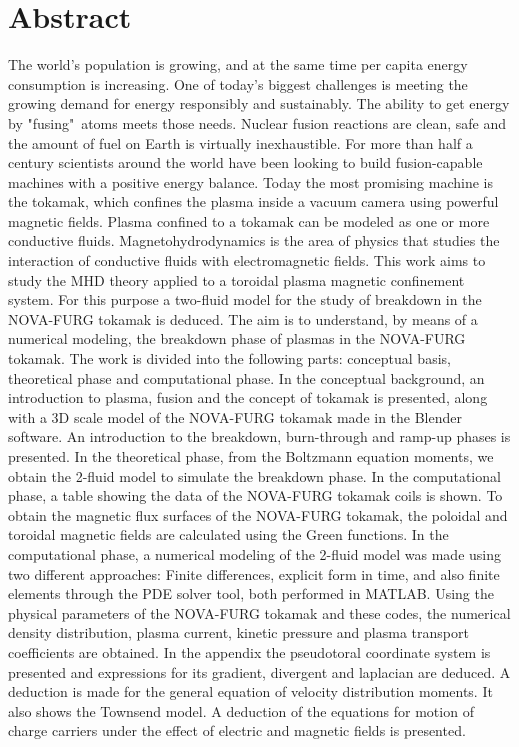 \documentclass[12pt,oneside,a4paper]{abntex2}
\begin{document}
\chapter*{Abstract}
\noindent The world's population is growing, and at the same time per capita energy consumption is increasing.
One of today's biggest challenges is meeting the growing demand for energy responsibly and sustainably.
The ability to get energy by "fusing"\ atoms meets those needs.
Nuclear fusion reactions are clean, safe and the amount of fuel on Earth is virtually inexhaustible.
For more than half a century scientists around the world have been looking to build fusion-capable machines with a positive energy balance.
Today the most promising machine is the tokamak, which confines the plasma inside a vacuum camera using powerful magnetic fields.
Plasma confined to a tokamak can be modeled as one or more conductive fluids. Magnetohydrodynamics is the area of physics that studies the interaction of conductive fluids with electromagnetic fields.
This work aims to study the MHD theory applied to a toroidal plasma magnetic confinement system.
For this purpose a two-fluid model for the study of breakdown in the NOVA-FURG tokamak is deduced.
The aim is to understand, by means of a numerical modeling, the breakdown phase of plasmas in the NOVA-FURG tokamak.
The work is divided into the following parts: conceptual basis, theoretical phase and computational phase. In the conceptual background, an introduction to plasma, fusion and the concept of tokamak is presented, along with a 3D scale model of the NOVA-FURG tokamak made in the Blender software. An introduction to the breakdown, burn-through and ramp-up phases is presented.
In the theoretical phase, from the Boltzmann equation moments, we obtain the 2-fluid model to simulate the breakdown phase. In the computational phase, a table showing the data of the NOVA-FURG tokamak coils is shown.
To obtain the magnetic flux surfaces of the NOVA-FURG tokamak, the poloidal and toroidal magnetic fields are calculated using the Green functions.
In the computational phase, a numerical modeling of the 2-fluid model was made using two different approaches: Finite differences, explicit form in time, and also finite elements through the PDE solver tool, both performed in MATLAB. 
Using the physical parameters of the NOVA-FURG tokamak and these codes, the numerical density distribution, plasma current, kinetic pressure and plasma transport coefficients are obtained. In the appendix the pseudotoral coordinate system is presented and expressions for its gradient, divergent and laplacian are deduced. A deduction is made for the general equation of velocity distribution moments. It also shows the Townsend model. A deduction of the equations for motion of charge carriers under the effect of electric and magnetic fields is presented. 
\end{document}

